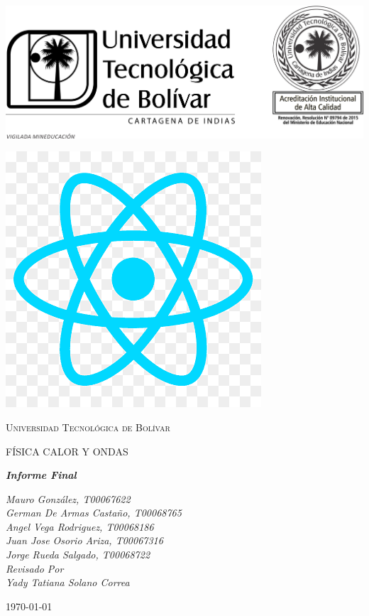 \documentclass[letterpaper, 12pt]{article}
\begin{document}
\begin{titlepage}
	\centering
	\begin{multicols}{2}
		\begin{center}
			\begin{minipage}{0.4\textwidth}
				\centering
				\includegraphics[width=0.7\linewidth]{Images/logo_utb.png}
			\end{minipage}
			\begin{minipage}{0.4\textwidth}
				\centering
				\includegraphics[width=0.3\linewidth]{Images/png-transparent-js-react-js-logo-react-react-native-logos-icon-thumbnail.png}
			\end{minipage}
		\end{center}
	\end{multicols}

	{\scshape\LARGE Universidad Tecnológica de Bolívar \par}
	\vspace{1cm}

	{\scshape\Large FÍSICA CALOR Y ONDAS \par}
	\vspace{2.5cm}

	\slshape {\Large \bfseries{} Informe Final \\}
	\vspace{2cm}

	\slshape {\itshape{} Mauro González, T00067622 \\}
	\slshape {\itshape{} German De Armas Castaño, T00068765 \\}
	\slshape {\itshape{} Angel Vega Rodriguez, T00068186 \\}
	\slshape {\itshape{} Juan Jose Osorio Ariza, T00067316 \\}
	\slshape {\itshape{} Jorge Rueda Salgado, T00068722 \\}
	\vfill
	Revisado Por \\
	Yady Tatiana Solano Correa\\
	{\large \today\par}
\end{titlepage}
\end{document}
